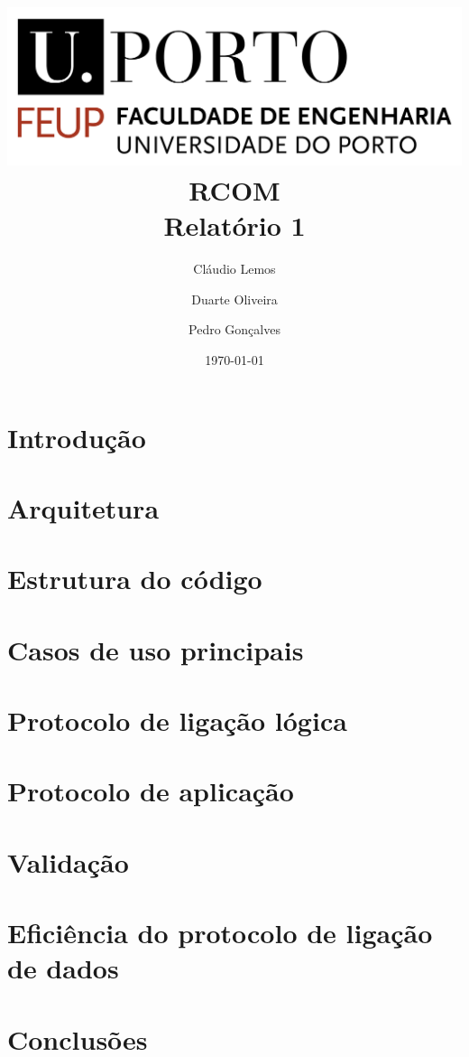 \documentclass[12pt, letterpaper]{article}
\title{
    \includegraphics[scale=0.5]{FEUP.png}\\
    \vspace{40pt}
    \huge\textbf{RCOM}\\
    \vspace{20pt}
    Relatório 1\\
    \vspace{20pt}
}
\author{
    Cláudio Lemos
    \and
    Duarte Oliveira
    \and
    Pedro Gonçalves
}
\date{\today}
\begin{document}
\maketitle

\newpage
\tableofcontents
\newpage

\section{Introdução}


\section{Arquitetura}


\section{Estrutura do código}


\section{Casos de uso principais}


\section{Protocolo de ligação lógica}


\section{Protocolo de aplicação}


\section{Validação}


\section{Eficiência do protocolo de ligação de dados}


\section{Conclusões}

\end{document}
